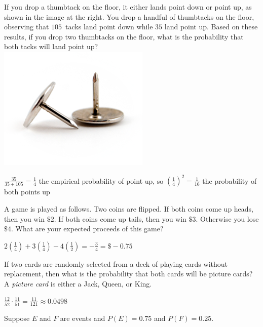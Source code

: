 \documentclass[addpoints,12pt]{exam}
\begin{document}
\begin{questions}
\question[10]
\begin{multicols}{2}
If you drop a thumbtack on the floor, it either lands point down
or point up, as shown in the image at the right.
You drop a handful of thumbtacks on the floor, observing that
$105$~tacks land point down while $35$ land point up.
Based on these results, if you drop two thumbtacks on the floor, what
is the probability that both tacks will land point up?
\columnbreak\\
\includegraphics[scale=.6]{Thumbtacks}
\end{multicols}
\begin{solution}
$\frac{35}{35+105}=\frac{1}{4}$ the empirical probability
of point up, so $\left(\frac{1}{4}\right)^2=\frac{1}{16}$
the probability of both points up
\end{solution}

\question[10] A game is played as follows.
Two coins are flipped. If both coins come up
heads, then you win $\$2$. If both coins come
up tails, then you win $\$3$. 
Otherwise you lose $\$4$. What are your expected proceeds
of this game?
\begin{solution}
$2\left(\frac{1}{4}\right)+3\left(\frac{1}{4}\right)
-4\left(\frac{1}{2}\right)=-\frac{3}{4}=\$-0.75$
\end{solution}

\question[10] If two cards are randomly selected from a deck
of playing cards without replacement,
then what is the probability that both cards
will be picture cards?  A {\em picture card} is either a Jack, Queen, or King.
\begin{solution}
$\frac{12}{52}\cdot\frac{11}{51}=\frac{11}{121}\approx 0.0498$
\end{solution}

\question[15] Suppose $E$ and $F$ are events
and $P\left(E\right)=0.75$ and $P\left(F\right)=0.25$.
\end{questions}
\end{document}
